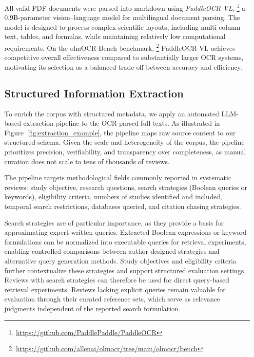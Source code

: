 All valid PDF documents were parsed into markdown using \textit{PaddleOCR-VL},%
\footnote{\url{https://github.com/PaddlePaddle/PaddleOCR}}
a 0.9B-parameter vision--language model for multilingual document parsing. The model is designed to process complex scientific layouts, including multi-column text, tables, and formulas, while maintaining relatively low computational requirements. On the olmOCR-Bench benchmark,%
\footnote{\url{https://github.com/allenai/olmocr/tree/main/olmocr/bench}}
PaddleOCR-VL achieves competitive overall effectiveness compared to substantially larger OCR systems, motivating its selection as a balanced trade-off between accuracy and efficiency.

\subsection{Structured Information Extraction}
To enrich the corpus with structured metadata, we apply an automated LLM-based extraction pipeline to the OCR-parsed full texts. As illustrated in Figure~\ref{fig:extraction_example}, the pipeline maps raw source content to our structured schema. Given the scale and heterogeneity of the corpus, the pipeline prioritizes precision, verifiability, and transparency over completeness, as manual curation does not scale to tens of thousands of reviews.

The pipeline targets methodological fields commonly reported in systematic reviews: study objective, research questions, search strategies (Boolean queries or keywords), eligibility criteria, numbers of studies identified and included, temporal search restrictions, databases queried, and citation chasing strategies. 

Search strategies are of particular importance, as they provide a basis for approximating expert-written queries. Extracted Boolean expressions or keyword formulations can be normalized into executable queries for retrieval experiments, enabling controlled comparisons between author-designed strategies and alternative query generation methods. Study objectives and eligibility criteria further contextualize these strategies and support structured evaluation settings. Reviews with search strategies can therefore be used for direct query-based retrieval experiments. Reviews lacking explicit queries remain valuable for evaluation through their curated reference sets, which serve as relevance judgments independent of the reported search formulation.


